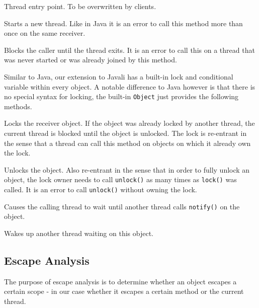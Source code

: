 \documentclass[letterpaper]{article}
\begin{document}
\begin{description}[leftmargin=!,labelwidth=\widthof{\texttt{start()}}]
 \item[\texttt{run()}] Thread entry point. To be overwritten by clients.
 \item[\texttt{start()}] Starts a new thread. Like in Java it is an error to
 call this method more than once on the same receiver.
 \item[\texttt{join()}] Blocks the caller until the thread exits. It is an error
 to call this on a thread that was never started or was already joined by this method.
\end{description}

Similar to Java, our extension to Javali has a built-in lock and conditional variable
within every object. A notable difference to Java however is that there is
no special syntax for locking, the built-in \texttt{Object} just provides the
following methods.

\begin{description}[leftmargin=!,labelwidth=\widthof{\texttt{unlock()}}]
 \item[\texttt{lock()}] Locks the receiver object. If the object was already locked by
 another thread, the current thread is blocked until the object is unlocked. The
 lock is re-entrant in the sense that a thread can call this method on objects
 on which it already own the lock.
 \item[\texttt{unlock()}] Unlocks the object. Also re-entrant in the sense that
 in order to fully unlock an object,
 the lock owner needs to call \texttt{unlock()} as many times as \texttt{lock()}
 was called. It is an error to call \texttt{unlock()} without owning the lock.
 \item[\texttt{wait()}] Causes the calling thread to wait until another thread
 calls \texttt{notify()} on the object.
 \item[\texttt{notify()}] Wakes up another thread waiting on this object.
\end{description}

\subsection{Escape Analysis}

The purpose of escape analysis is to determine whether an object escapes a certain
scope - in our case whether it escapes a certain method or the current thread.
\end{document}
